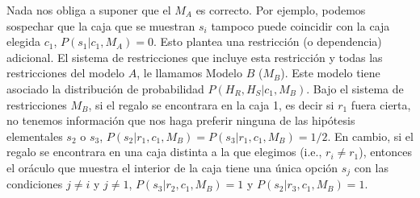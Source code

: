 \documentclass[a4paper,11pt]{book}
\theoremstyle{definition}
\begin{document}
Nada nos obliga a suponer que el $M_A$ es correcto.
%
Por ejemplo, podemos sospechar que la caja que se muestran $s_i$ tampoco puede coincidir con la caja elegida $c_1$, $P(s_1|c_1,M_A)=0$.
%
Esto plantea una restricci\'on (o dependencia) adicional.
%
El sistema de restricciones que incluye esta restricci\'on y todas las restricciones del modelo $A$, le llamamos Modelo $B$ ($M_B$).
%
Este modelo tiene asociado la distribuci\'on de probabilidad $P(H_R,H_S|c_1,M_B)$.
%
Bajo el sistema de restricciones $M_B$, si el regalo se encontrara en la caja 1, es decir si $r_1$ fuera cierta, no tenemos informaci\'on que nos haga preferir ninguna de las hip\'otesis elementales $s_2$ o $s_3$, $P(s_2|r_1,c_1,M_B)=P(s_3|r_1,c_1,M_B)=1/2$.
%
En cambio, si el regalo se encontrara en una caja distinta a la que elegimos (i.e., $r_i \neq r_1$), entonces el or\'aculo que muestra el interior de la caja tiene una \'unica opci\'on $s_j$ con las condiciones $j\neq i$ y $j\neq 1$, $P(s_3|r_2,c_1,M_B)=1$ y $P(s_2|r_3,c_1,M_B)=1$.
\end{document}
